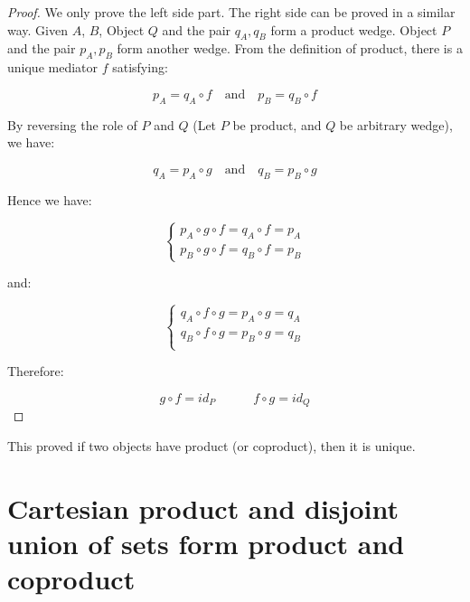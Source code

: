\documentclass[UTF8]{article}
\begin{document}
\begin{proof}
We only prove the left side part. The right side can be proved in a similar way. Given $A$, $B$, Object $Q$ and the pair $q_A, q_B$ form a product wedge. Object $P$ and the pair $p_A, p_B$ form another wedge. From the definition of product, there is a unique mediator $f$ satisfying:

\[
p_A = q_A \circ f \quad \text{and} \quad p_B = q_B \circ f
\]

By reversing the role of $P$ and $Q$ (Let $P$ be product, and $Q$ be arbitrary wedge), we have:

\[
q_A = p_A \circ g \quad \text{and} \quad q_B = p_B \circ g
\]

Hence we have:

\[
\begin{cases}
p_A \circ g \circ f = q_A \circ f = p_A \\
p_B \circ g \circ f = q_B \circ f = p_B
\end{cases}
\]

and:

\[
\begin{cases}
q_A \circ f \circ g = p_A \circ g = q_A \\
q_B \circ f \circ g = p_B \circ g = q_B \\
\end{cases}
\]

Therefore:

\[
g \circ f = id_P \quad \quad \quad f \circ g = id_Q
\]

\end{proof}

This proved if two objects have product (or coproduct), then it is unique.

\chapter*{Cartesian product and disjoint union of sets form product and coproduct}
\end{document}
